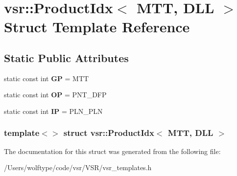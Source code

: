 \hypertarget{structvsr_1_1_product_idx_3_01_m_t_t_00_01_d_l_l_01_4}{\section{vsr\-:\-:Product\-Idx$<$ M\-T\-T, D\-L\-L $>$ Struct Template Reference}
\label{structvsr_1_1_product_idx_3_01_m_t_t_00_01_d_l_l_01_4}
}
\subsection*{Static Public Attributes}
\begin{DoxyCompactItemize}
\item 
\hypertarget{structvsr_1_1_product_idx_3_01_m_t_t_00_01_d_l_l_01_4_a9539ae7563edd16bb62237884a0c1dd2}{static const int {\bfseries G\-P} = M\-T\-T}\label{structvsr_1_1_product_idx_3_01_m_t_t_00_01_d_l_l_01_4_a9539ae7563edd16bb62237884a0c1dd2}

\item 
\hypertarget{structvsr_1_1_product_idx_3_01_m_t_t_00_01_d_l_l_01_4_ac6709148b534364a7898b776f7ad9206}{static const int {\bfseries O\-P} = P\-N\-T\-\_\-\-D\-F\-P}\label{structvsr_1_1_product_idx_3_01_m_t_t_00_01_d_l_l_01_4_ac6709148b534364a7898b776f7ad9206}

\item 
\hypertarget{structvsr_1_1_product_idx_3_01_m_t_t_00_01_d_l_l_01_4_aaf9b1d7ecba85c18a2f0c67023b6d6f3}{static const int {\bfseries I\-P} = P\-L\-N\-\_\-\-P\-L\-N}\label{structvsr_1_1_product_idx_3_01_m_t_t_00_01_d_l_l_01_4_aaf9b1d7ecba85c18a2f0c67023b6d6f3}

\end{DoxyCompactItemize}
\subsubsection*{template$<$$>$ struct vsr\-::\-Product\-Idx$<$ M\-T\-T, D\-L\-L $>$}



The documentation for this struct was generated from the following file\-:\begin{DoxyCompactItemize}
\item 
/\-Users/wolftype/code/vsr/\-V\-S\-R/vsr\-\_\-templates.\-h\end{DoxyCompactItemize}
